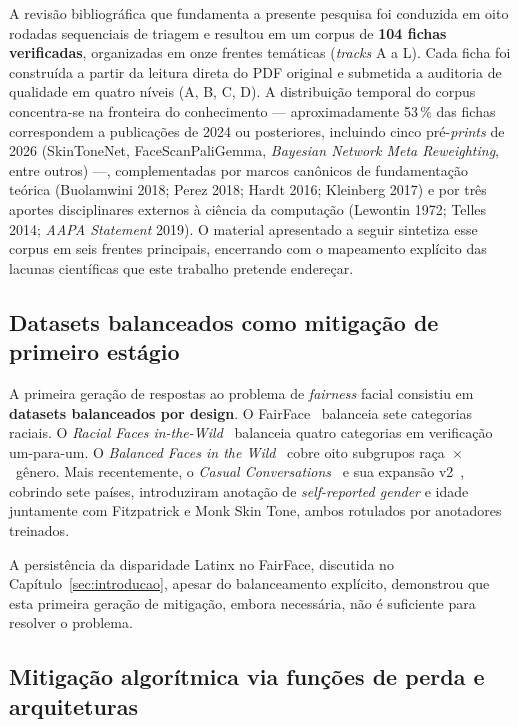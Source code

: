 A revisão bibliográfica que fundamenta a presente pesquisa foi conduzida em oito rodadas sequenciais de triagem e resultou em um corpus de \textbf{104 fichas verificadas}, organizadas em onze frentes temáticas (\emph{tracks} A a L). Cada ficha foi construída a partir da leitura direta do PDF original e submetida a auditoria de qualidade em quatro níveis (A, B, C, D). A distribuição temporal do corpus concentra-se na fronteira do conhecimento --- aproximadamente 53\,\% das fichas correspondem a publicações de 2024 ou posteriores, incluindo cinco pré-\emph{prints} de 2026 (SkinToneNet, FaceScanPaliGemma, \emph{Bayesian Network Meta Reweighting}, entre outros) ---, complementadas por marcos canônicos de fundamentação teórica (Buolamwini 2018; Perez 2018; Hardt 2016; Kleinberg 2017) e por três aportes disciplinares externos à ciência da computação (Lewontin 1972; Telles 2014; \emph{AAPA Statement} 2019). O material apresentado a seguir sintetiza esse corpus em seis frentes principais, encerrando com o mapeamento explícito das lacunas científicas que este trabalho pretende endereçar.

\subsection{Datasets balanceados como mitigação de primeiro estágio}
\label{sec:rl_datasets}

A primeira geração de respostas ao problema de \emph{fairness} facial consistiu em \textbf{datasets balanceados por design}. O FairFace~\cite{karkkainen2021fairface} balanceia sete categorias raciais. O \emph{Racial Faces in-the-Wild}~\cite{wang2019racial} balanceia quatro categorias em verificação um-para-um. O \emph{Balanced Faces in the Wild}~\cite{robinson2020face} cobre oito subgrupos raça~$\times$~gênero. Mais recentemente, o \emph{Casual Conversations}~\cite{hazirbas2021towards} e sua expansão v2~\cite{porgali2023casual}, cobrindo sete países, introduziram anotação de \emph{self-reported gender} e idade juntamente com Fitzpatrick e Monk Skin Tone, ambos rotulados por anotadores treinados.

A persistência da disparidade Latinx no FairFace, discutida no Capítulo~\ref{sec:introducao}, apesar do balanceamento explícito, demonstrou que esta primeira geração de mitigação, embora necessária, não é suficiente para resolver o problema.

\subsection{Mitigação algorítmica via funções de perda e arquiteturas}
\label{sec:rl_mitigacao}

